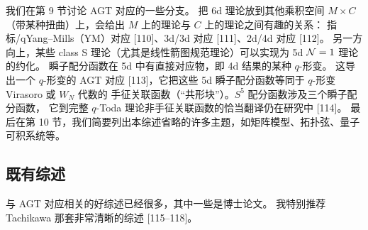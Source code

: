 我们在第 9 节讨论 AGT 对应的一些分支。
把 6d 理论放到其他乘积空间 $M\times C$（带某种扭曲）上，会给出 $M$ 上的理论与 $C$ 上的理论之间有趣的关系：
指标/qYang--Mills（YM）对应 [110]、3d/3d 对应 [111]、2d/4d 对应 [112]。
另一方向上，某些 class S 理论（尤其是线性箭图规范理论）可以实现为 5d $\mathcal{N}=1$ 理论的约化。
瞬子配分函数在 5d 中有直接对应物，即 4d 结果的某种 $q$-形变。
这导出一个 $q$-形变的 AGT 对应 [113]，它把这些 5d 瞬子配分函数等同于 $q$-形变 Virasoro 或 $W_N$ 代数的
手征关联函数（“共形块”）。$S^5$ 配分函数涉及三个瞬子配分函数，
它到完整 $q$-Toda 理论非手征关联函数的恰当翻译仍在研究中 [114]。
最后在第 10 节，我们简要列出本综述省略的许多主题，如矩阵模型、拓扑弦、量子可积系统等。

\subsection{既有综述}

与 AGT 对应相关的好综述已经很多，其中一些是博士论文。
我特别推荐 Tachikawa 那套非常清晰的综述 [115--118]。

